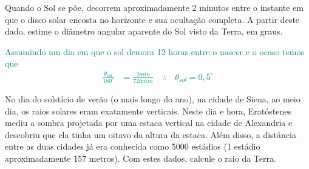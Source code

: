\begin{prob}[ref: P02]
	Quando o Sol se põe, decorrem aproximadamente 2 minutos entre o instante em que o disco solar encosta no horizonte e sua ocultação completa. A partir deste dado, estime o diâmetro angular aparente do Sol visto da Terra, em graus.
\end{prob}

\begin{sol}
	\textcolor {teal} {
		Assumindo um dia em que o sol demora 12 horas entre o nascer e o ocaso temos que
		\begin{align}
			\frac{\theta_{sol}}{180^{\circ}}&=\frac{2min}{720min}\quad \therefore\quad\theta_{sol}=0,5^{\circ}			
		\end{align}
	}
\end{sol}
\begin{prob}[ref: P03]
	No dia do solstício de verão (o mais longo do ano), na cidade de Siena, ao meio dia, os raios solares eram exatamente verticais. Neste dia e hora, Eratóstenes mediu a sombra projetada por uma
	estaca vertical na cidade de Alexandria e descobriu que ela tinha um oitavo da altura da estaca. Além disso, a distância entre as duas cidades já era conhecida como 5000 estádios (1 estádio aproximadamente 157 metros). Com estes dados, calcule o raio da Terra.
\end{prob}

